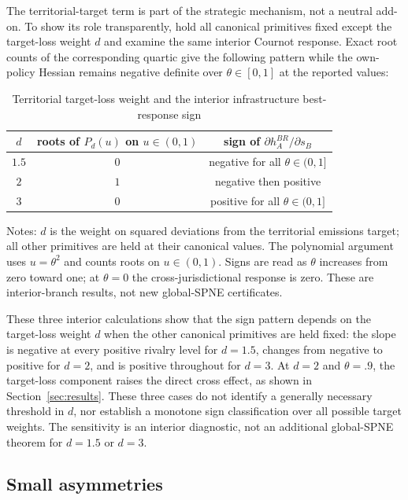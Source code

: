 The territorial-target term is part of the strategic mechanism, not a neutral add-on. To show its role transparently, hold all canonical primitives fixed except the target-loss weight $d$ and examine the same interior Cournot response. Exact root counts of the corresponding quartic give the following pattern while the own-policy Hessian remains negative definite over $\theta\in[0,1]$ at the reported values:

\begin{table}[htbp]
\centering
\caption{Territorial target-loss weight and the interior infrastructure best-response sign}
\label{tab:d-sensitivity}
\begin{tabular}{ccc}
\toprule
$d$ & roots of $P_d(u)$ on $u\in(0,1)$ & sign of $\partial h_A^{BR}/\partial s_B$\\
\midrule
$1.5$ & $0$ & negative for all $\theta\in(0,1]$\\
$2$ & $1$ & negative then positive\\
$3$ & $0$ & positive for all $\theta\in(0,1]$\\
\bottomrule
\end{tabular}
\begin{flushleft}\footnotesize
Notes: $d$ is the weight on squared deviations from the territorial emissions target; all other primitives are held at their canonical values. The polynomial argument uses $u=\theta^2$ and counts roots on $u\in(0,1)$. Signs are read as $\theta$ increases from zero toward one; at $\theta=0$ the cross-jurisdictional response is zero. These are interior-branch results, not new global-SPNE certificates.
\end{flushleft}
\end{table}

These three interior calculations show that the sign pattern depends on the target-loss weight $d$ when the other canonical primitives are held fixed: the slope is negative at every positive rivalry level for $d=1.5$, changes from negative to positive for $d=2$, and is positive throughout for $d=3$. At $d=2$ and $\theta=.9$, the target-loss component raises the direct cross effect, as shown in Section~\ref{sec:results}. These three cases do not identify a generally necessary threshold in $d$, nor establish a monotone sign classification over all possible target weights. The sensitivity is an interior diagnostic, not an additional global-SPNE theorem for $d=1.5$ or $d=3$.

\subsection{Small asymmetries}

